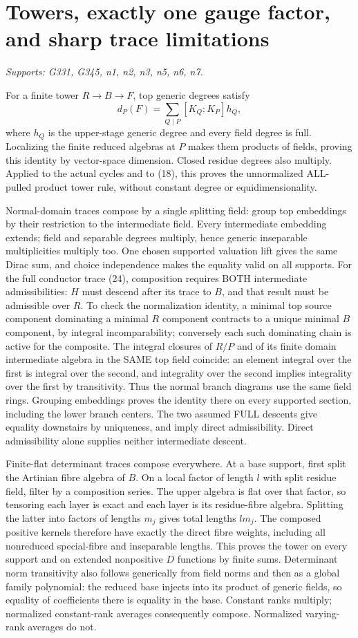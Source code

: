 \section{Towers, exactly one gauge factor, and sharp trace limitations}
\textit{Supports: G331, G345, n1, n2, n3, n5, n6, n7.}

For a finite tower $R\to B\to F$, top generic degrees satisfy
\[
d_P(F)=\sum_{Q\mid P}[K_Q:K_P]h_Q,
\]
where $h_Q$ is the upper-stage generic degree and every field degree is full. Localizing the finite reduced algebras at $P$ makes them products of fields, proving this identity by vector-space dimension. Closed residue degrees also multiply. Applied to the actual cycles and to (18), this proves the unnormalized ALL-pulled product tower rule, without constant degree or equidimensionality.

Normal-domain traces compose by a single splitting field: group top embeddings by their restriction to the intermediate field. Every intermediate embedding extends; field and separable degrees multiply, hence generic inseparable multiplicities multiply too. One chosen supported valuation lift gives the same Dirac sum, and choice independence makes the equality valid on all supports. For the full conductor trace (24), composition requires BOTH intermediate admissibilities: $H$ must descend after its trace to $B$, and that result must be admissible over $R$. To check the normalization identity, a minimal top source component dominating a minimal $R$ component contracts to a unique minimal $B$ component, by integral incomparability; conversely each such dominating chain is active for the composite. The integral closures of $R/P$ and of its finite domain intermediate algebra in the SAME top field coincide: an element integral over the first is integral over the second, and integrality over the second implies integrality over the first by transitivity. Thus the normal branch diagrams use the same field rings. Grouping embeddings proves the identity there on every supported section, including the lower branch centers. The two assumed FULL descents give equality downstairs by uniqueness, and imply direct admissibility. Direct admissibility alone supplies neither intermediate descent.

Finite-flat determinant traces compose everywhere. At a base support, first split the Artinian fibre algebra of $B$. On a local factor of length $l$ with split residue field, filter by a composition series. The upper algebra is flat over that factor, so tensoring each layer is exact and each layer is its residue-fibre algebra. Splitting the latter into factors of lengths $m_j$ gives total lengths $lm_j$. The composed positive kernels therefore have exactly the direct fibre weights, including all nonreduced special-fibre and inseparable lengths. This proves the tower on every support and on extended nonpositive $D$ functions by finite sums. Determinant norm transitivity also follows generically from field norms and then as a global family polynomial: the reduced base injects into its product of generic fields, so equality of coefficients there is equality in the base. Constant ranks multiply; normalized constant-rank averages consequently compose. Normalized varying-rank averages do not.

